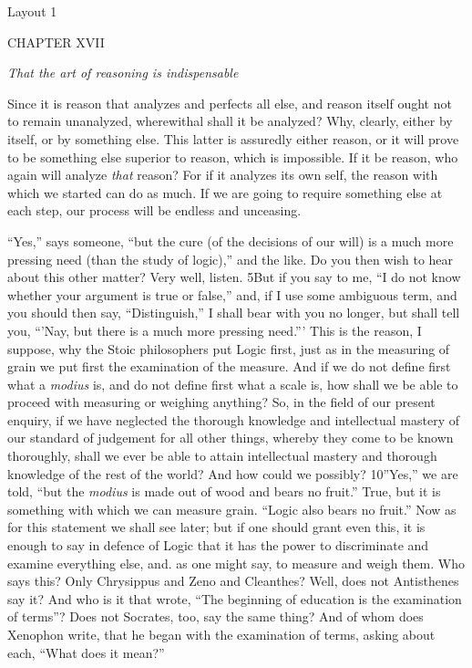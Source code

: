 
Layout 1

CHAPTER XVII

\emph{That the art of reasoning is indispensable}

Since it is reason that analyzes and perfects all else, and reason itself ought not to remain unanalyzed, wherewithal shall it be analyzed? Why, clearly, either by itself, or by something else. This latter is assuredly either reason, or it will prove to be something else superior to reason, which is impossible. If it be reason, who again will analyze \emph{that} reason? For if it analyzes its own self, the reason with which we started can do as much. If we are going to require something else at each step, our process will be endless and unceasing.

``Yes,'' says someone, ``but the cure (of the decisions of our will) is a much more pressing need (than the study of logic),'' and the like. Do you then wish to hear about this other matter? Very well, listen. 5But if you say to me, ``I do not know whether your argument is true or false,'' and, if I use some ambiguous term, and you should then say, ``Distinguish,'' I shall bear with you no longer, but shall tell you, ``'Nay, but there is a much more pressing need.''' This is the reason, I suppose, why the Stoic philosophers put Logic first, just as in the measuring of grain we put first the examination of the measure. And if we do not define first what a \emph{modius} is, and do not define first what a scale is, how shall we be able to proceed with measuring or weighing anything? So, in the field of our present enquiry, if we have neglected the thorough knowledge and intellectual mastery of our standard of judgement for all other things, whereby they come to be known thoroughly, shall we ever be able to attain intellectual mastery and thorough knowledge of the rest of the world? And how could we possibly? 10''Yes,'' we are told, ``but the \emph{modius} is made out of wood and bears no fruit.'' True, but it is something with which we can measure grain. ``Logic also bears no fruit.'' Now as for this statement we shall see later; but if one should grant even this, it is enough to say in defence of Logic that it has the power to discriminate and examine everything else, and. as one might say, to measure and weigh them. Who says this? Only Chrysippus and Zeno and Cleanthes? Well, does not Antisthenes say it? And who is it that wrote, ``The beginning of education is the examination of terms''? Does not Socrates, too, say the same thing? And of whom does Xenophon write, that he began with the examination of terms, asking about each, ``What does it mean?''

